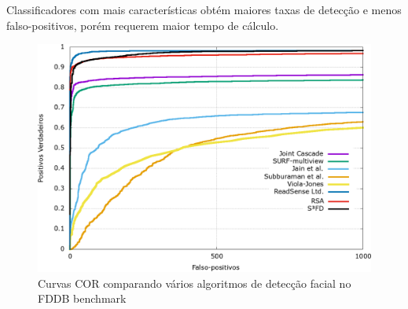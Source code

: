 Classificadores com mais características obtém maiores taxas de detecção e menos falso-positivos, porém requerem maior tempo de cálculo.

\begin{figure}[htbp]
   \caption[FDDB Benchmark]{Curvas COR comparando vários algoritmos de detecção facial no FDDB benchmark \cite{fddbTech}}
   \label{fig:roc_fddb_benchmark}
   \begin{center}
     \includegraphics[width=\textwidth]{imagens/FDDB_deteccao_compara.png}
   \end{center}
\end{figure}